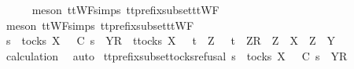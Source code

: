 \ \ \ \ \isamarkupfalse%
\ {\isacharparenleft}meson\ ttWF{\isachardot}simps{\isacharparenleft}{}{\isacharparenright}\ tt{\isacharunderscore}prefix{\isacharunderscore}subset{\isacharunderscore}ttWF{\isacharparenright}\isanewline
\ \ \ \ \isamarkupfalse%
\ {\isacharparenleft}meson\ ttWF{\isachardot}simps{\isacharparenleft}{}{\isacharparenright}\ tt{\isacharunderscore}prefix{\isacharunderscore}subset{\isacharunderscore}ttWF{\isacharparenright}\isanewline
\ \ \isamarkupfalse%
\ \isamarkupfalse%
\ {\isachardoublequoteopen}s\ {\isasymin}\ tocks\ X\ {\isasymLongrightarrow}\ {\isasymrho}\ {\isasymlesssim}\isactrlsub C\ s\ {\isacharat}\ {\isacharbrackleft}{\isacharbrackleft}Y{\isacharbrackright}\isactrlsub R{\isacharbrackright}\ {\isasymLongrightarrow}\ {\isasymexists}t{\isasymin}tocks\ X{\isachardot}\ {\isasymrho}\ {\isacharequal}\ t\ {\isasymor}\ {\isacharparenleft}{\isasymexists}Z{\isachardot}\ {\isasymrho}\ {\isacharequal}\ t\ {\isacharat}\ {\isacharbrackleft}{\isacharbrackleft}Z{\isacharbrackright}\isactrlsub R{\isacharbrackright}\ {\isasymand}\ {\isacharparenleft}Z\ {\isasymsubseteq}\ X\ {\isasymor}\ Z\ {\isasymsubseteq}\ Y{\isacharparenright}{\isacharparenright}{\isachardoublequoteclose}\isanewline
\ \ \ \ \isamarkupfalse%
\ calculation\ \isamarkupfalse%
\ auto\isanewline
{}\isamarkupfalse%
%
\endisatagproof
{\isafoldproof}%
%
\isadelimproof
\isanewline
%
\endisadelimproof
\isanewline
{}\isamarkupfalse%
\ tt{\isacharunderscore}prefix{\isacharunderscore}subset{\isacharunderscore}tocks{\isacharunderscore}refusal{}{\isacharcolon}\ {\isachardoublequoteopen}s\ {\isasymin}\ tocks\ X\ {\isasymLongrightarrow}\ {\isasymrho}\ {\isasymlesssim}\isactrlsub C\ s\ {\isacharat}\ {\isacharbrackleft}{\isacharbrackleft}Y{\isacharbrackright}\isactrlsub R{\isacharbrackright}\ {\isasymLongrightarrow}\isanewline
